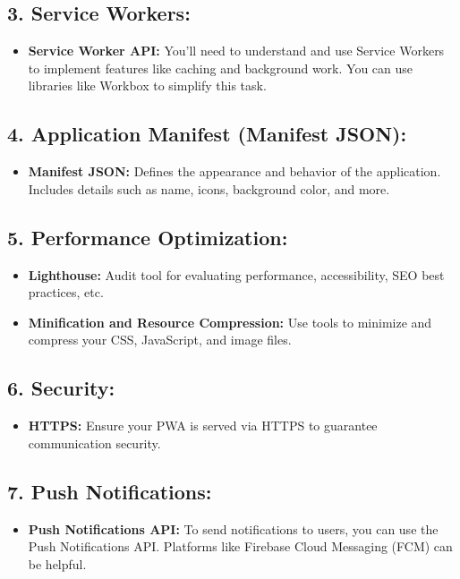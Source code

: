 \documentclass{article}
\begin{document}
\subsection*{3. Service Workers:}
\begin{itemize}
  \item \textbf{Service Worker API:} You'll need to understand and use Service Workers to implement features like caching and background work. You can use libraries like Workbox to simplify this task.
\end{itemize}

\subsection*{4. Application Manifest (Manifest JSON):}
\begin{itemize}
  \item \textbf{Manifest JSON:} Defines the appearance and behavior of the application. Includes details such as name, icons, background color, and more.
\end{itemize}

\subsection*{5. Performance Optimization:}
\begin{itemize}
  \item \textbf{Lighthouse:} Audit tool for evaluating performance, accessibility, SEO best practices, etc.
  \item \textbf{Minification and Resource Compression:} Use tools to minimize and compress your CSS, JavaScript, and image files.
\end{itemize}

\subsection*{6. Security:}
\begin{itemize}
  \item \textbf{HTTPS:} Ensure your PWA is served via HTTPS to guarantee communication security.
\end{itemize}

\subsection*{7. Push Notifications:}
\begin{itemize}
  \item \textbf{Push Notifications API:} To send notifications to users, you can use the Push Notifications API. Platforms like Firebase Cloud Messaging (FCM) can be helpful.
\end{itemize}
\end{document}
